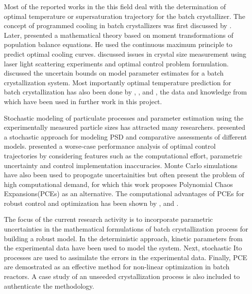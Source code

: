 \documentclass[3p,times,authoryear]{elsarticle}
\begin{document}
Most of the reported works in the this field deal with the determination of optimal temperature or supersaturation trajectory for the batch crystallizer. The concept of programmed cooling in batch crystallizers was first discussed by \cite{mullin}.
Later, \cite{agjones} presented a mathematical theory based on moment transformations of population balance equations. He used the continuous maximum principle to predict optimal cooling curves.
\cite{rawlings} discussed issues in crystal size measurement using laser light scattering experiments and optimal control problem formulation. \cite{miller_rawlings}  discussed the uncertain bounds on model parameter estimates for a batch crystallization system. 
Most importantly optimal temperature prediction for batch crystallization has also been done by \cite{hu}, \cite{shi}, \cite{paeng} and \cite{corriou}, the data and knowledge from which have been used in further work in this project.\par
Stochastic modeling of particulate processes and parameter estimation using the experimentally measured particle sizes has attracted many researchers. \cite{grosso} presented a stochastic approach for modeling PSD and comparative assessments of different models. \cite{ma} presented a worse-case performance analysis of optimal control trajectories by considering features such as the computational effort, parametric uncertainty and control implementation inaccuracies. Monte Carlo simulations have also been used to propogate uncertainities but often present the problem of high computational demand, for which this work proposes Polynomial Chaos Expansions(PCEs) as an alternative. The computational advantages of PCEs for robust control and optimization has been shown by \cite{nagy}, \cite{kim} and \cite{kumar}. \par
The focus of the current research activity is to incorporate parametric uncertainties in the mathematical formulations of batch crystallization process for building a robust model. In the deterministic approach, kinetic parameters from the experimental data have been used to model the system. Next, stochastic Ito processes are used to assimilate the errors in the experimental data. Finally, PCE are demostrated as an effective method for non-linear optimization in batch reactors. A case study of an unseeded crystallization process is also included to authenticate the methodology.
\end{document}

